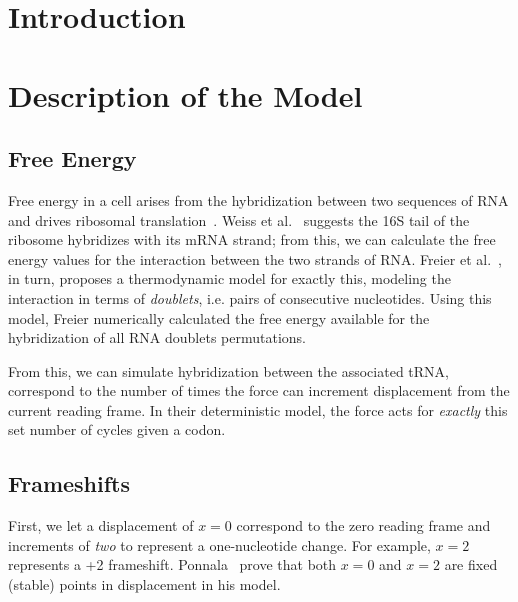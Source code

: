 \documentclass[12pt, draft]{article}
\numberwithin{equation}{section}
\begin{document}
\section{Introduction}

\section{Description of the Model}
\subsection{Free Energy}
\label{freeenergy}

Free energy in a cell arises from the hybridization between two
sequences of RNA and drives ribosomal translation~\cite{starmer}.
Weiss et al.~\cite{weiss} suggests the 16S tail of the ribosome hybridizes with its mRNA strand;
from this, we can calculate the free energy values for the interaction between the two strands of RNA.
Freier et al.~\cite{freier}, in turn, proposes a thermodynamic model for exactly this,
modeling the interaction in terms of \emph{doublets}, i.e. pairs of consecutive nucleotides.
Using this model, Freier numerically calculated the free energy available
for the hybridization of all RNA doublets permutations.

From this, we can simulate hybridization between the associated tRNA, correspond to the number
of times the force can increment displacement from the current reading frame.
In their deterministic model, the force acts for \emph{exactly} this set number of cycles given a codon.

\subsection{Frameshifts}


First, we let a displacement of $x = 0$ correspond to the zero reading frame and increments of
\emph{two} to represent a one-nucleotide change. For example, $x =2$ represents a +2 frameshift.
Ponnala~\cite{lalit:embs} prove that both $x = 0$ and $x = 2$ are fixed (stable) points in displacement in his model.

\end{document}
